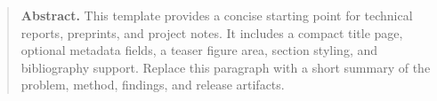 \begin{abstract}
\textbf{Abstract.}
This template provides a concise starting point for technical reports,
preprints, and project notes. It includes a compact title page, optional
metadata fields, a teaser figure area, section styling, and bibliography
support. Replace this paragraph with a short summary of the problem, method,
findings, and release artifacts.
\end{abstract}
